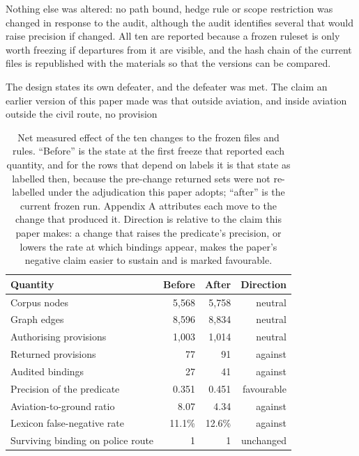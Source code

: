 Nothing else was altered: no path bound, hedge rule or scope restriction was changed in response to the audit, although the audit identifies several that would raise precision if changed. All ten are reported because a frozen ruleset is only worth freezing if departures from it are visible, and the hash chain of the current files is republished with the materials so that the versions can be compared.

The design states its own defeater, and the defeater was met. The claim an earlier version of this paper made was that outside aviation, and inside aviation outside the civil route, no provision

\begin{table}[!htb]
\centering
\caption{Net measured effect of the ten changes to the frozen files and rules. ``Before'' is the state at the first freeze that reported each quantity, and for the rows that depend on labels it is that state as labelled then, because the pre-change returned sets were not re-labelled under the adjudication this paper adopts; ``after'' is the current frozen run. Appendix A attributes each move to the change that produced it. Direction is relative to the claim this paper makes: a change that raises the predicate's precision, or lowers the rate at which bindings appear, makes the paper's negative claim easier to sustain and is marked favourable.}
\label{tab:t6}
\small
\begin{tabular}{@{}lrrr@{}}
\toprule
Quantity & Before & After & Direction \\
\midrule
Corpus nodes & 5,568 & 5,758 & neutral \\
Graph edges & 8,596 & 8,834 & neutral \\
Authorising provisions & 1,003 & 1,014 & neutral \\
Returned provisions & 77 & 91 & against \\
Audited bindings & 27 & 41 & against \\
Precision of the predicate & 0.351 & 0.451 & favourable \\
Aviation-to-ground ratio & 8.07 & 4.34 & against \\
Lexicon false-negative rate & 11.1\% & 12.6\% & against \\
Surviving binding on police route & 1 & 1 & unchanged \\
\bottomrule
\end{tabular}
\end{table}

